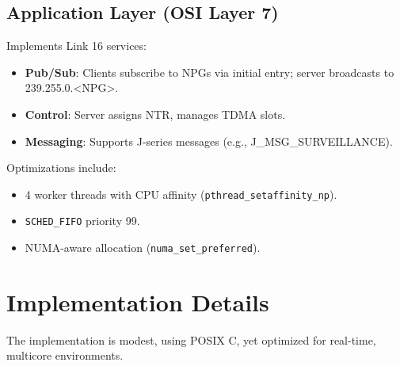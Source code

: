 \documentclass{article}
\begin{document}
\subsection{Application Layer (OSI Layer 7)}
Implements Link 16 services:
\begin{itemize}
    \item \textbf{Pub/Sub}: Clients subscribe to NPGs via initial entry; server broadcasts to 239.255.0.<NPG>.
    \item \textbf{Control}: Server assigns NTR, manages TDMA slots.
    \item \textbf{Messaging}: Supports J-series messages (e.g., J\_MSG\_SURVEILLANCE).
\end{itemize}
Optimizations include:
\begin{itemize}
    \item 4 worker threads with CPU affinity (\texttt{pthread\_setaffinity\_np}).
    \item \texttt{SCHED\_FIFO} priority 99.
    \item NUMA-aware allocation (\texttt{numa\_set\_preferred}).
\end{itemize}

\section{Implementation Details}
The implementation is modest, using POSIX C, yet optimized for real-time, multicore environments.
\end{document}
